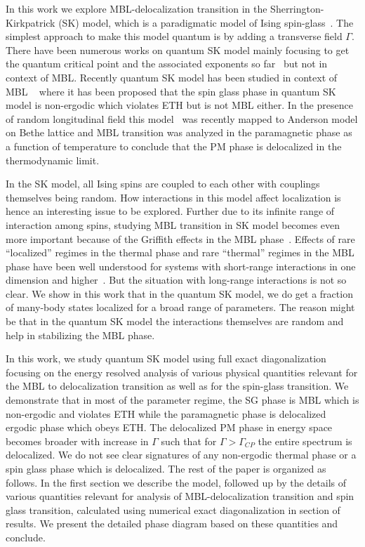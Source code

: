 \documentclass[prl,aps,twocolumn,floats,nofootinbib]{revtex4}
\begin{document}
In this work we explore MBL-delocalization transition in the Sherrington-Kirkpatrick (SK) model, which is a paradigmatic model of Ising spin-glass~\cite{SK,Young_rev}. The simplest approach to make this model quantum is by adding a transverse field $\Gamma$. There have been numerous works on quantum SK model mainly focusing to get the quantum critical point and the associated exponents so far~\cite{QSK} but not in context of MBL. Recently quantum SK model has been studied in context of MBL ~\cite{Baldwin} where it has been proposed that the spin glass phase in quantum SK model is non-ergodic which violates ETH but is not MBL either. In the presence of random longitudinal field this model~\cite{Burin} was recently mapped to Anderson model on Bethe lattice and MBL transition was analyzed in the paramagnetic phase as a function of temperature to conclude that the PM phase is delocalized in the thermodynamic limit.  

 In the SK model, all Ising spins are coupled to each other with couplings themselves being random. How interactions in this model affect localization is hence an interesting issue to be explored. Further due to its infinite range of interaction among spins, studying MBL transition in SK model becomes even more important because of the Griffith effects in the MBL phase~\cite{Agarwal_rare}. Effects of rare ``localized'' regimes in the thermal phase and rare ``thermal'' regimes in the MBL phase have been well understood for systems with short-range interactions in one dimension and higher~\cite{Ponte}. But the situation with long-range interactions is not so clear. We show in this work that in the quantum SK model, we do get a fraction of many-body states localized for a broad range of parameters. The reason might be that in the quantum SK model the interactions themselves are random and help in stabilizing the MBL phase. 

In this work, we study quantum SK model using full exact diagonalization focusing on the energy resolved analysis of various physical quantities relevant for the MBL to delocalization transition as well as for the spin-glass transition. We demonstrate that in most of the parameter regime, the SG phase is MBL which is non-ergodic and violates ETH while the paramagnetic phase is delocalized ergodic phase which obeys ETH. The delocalized PM phase in energy space becomes broader with increase in $\Gamma$ such that for $\Gamma > \Gamma_{CP}$ the entire spectrum is delocalized. 
We do not see clear signatures of any non-ergodic thermal phase or a spin glass phase which is delocalized.  
The rest of the paper is organized as follows. In the first section we describe the model, followed up by the details of various quantities relevant for  analysis of MBL-delocalization transition and spin glass transition, calculated using numerical exact diagonalization in section of results. We present the detailed phase diagram based on these quantities and conclude.
\end{document}
